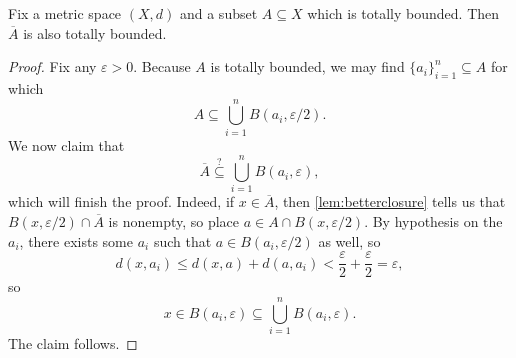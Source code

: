 \documentclass[../notes.tex]{subfiles}
\begin{document}
\begin{lemma}
	Fix a metric space $(X,d)$ and a subset $A\subseteq X$ which is totally bounded. Then $\overline A$ is also totally bounded.
\end{lemma}
\begin{proof}
	Fix any $\varepsilon>0$. Because $A$ is totally bounded, we may find $\{a_i\}_{i=1}^n\subseteq A$ for which
	\[A\subseteq\bigcup_{i=1}^nB(a_i,\varepsilon/2).\]
	We now claim that
	\[\overline A\stackrel?\subseteq\bigcup_{i=1}^nB(a_i,\varepsilon),\]
	which will finish the proof. Indeed, if $x\in\overline A$, then \autoref{lem:betterclosure} tells us that $B(x,\varepsilon/2)\cap\overline A$ is nonempty, so place $a\in A\cap B(x,\varepsilon/2)$. By hypothesis on the $a_i$, there exists some $a_i$ such that $a\in B(a_i,\varepsilon/2)$ as well, so
	\[d(x,a_i)\le d(x,a)+d(a,a_i)<\frac\varepsilon2+\frac\varepsilon2=\varepsilon,\]
	so
	\[x\in B(a_i,\varepsilon)\subseteq\bigcup_{i=1}^nB(a_i,\varepsilon).\]
	The claim follows.
\end{proof}
\end{document}
